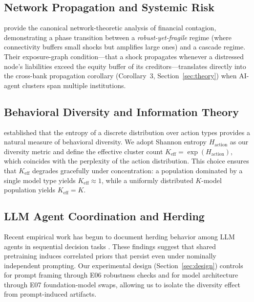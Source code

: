 
\subsection{Network Propagation and Systemic Risk}

\citet{acemoglu2015systemic} provide the canonical network-theoretic analysis of financial contagion, demonstrating a phase transition between a \emph{robust-yet-fragile} regime (where connectivity buffers small shocks but amplifies large ones) and a cascade regime. Their exposure-graph condition---that a shock propagates whenever a distressed node's liabilities exceed the equity buffer of its creditors---translates directly into the cross-bank propagation corollary (Corollary~3, Section~\ref{sec:theory}) when AI-agent clusters span multiple institutions.

\subsection{Behavioral Diversity and Information Theory}

\citet{shannon1948mathematical} established that the entropy of a discrete distribution over action types provides a natural measure of behavioral diversity. We adopt Shannon entropy $H_{\text{action}}$ as our diversity metric and define the effective cluster count $K_{\text{eff}} = \exp(H_{\text{action}})$, which coincides with the perplexity of the action distribution. This choice ensures that $K_{\text{eff}}$ degrades gracefully under concentration: a population dominated by a single model type yields $K_{\text{eff}} \approx 1$, while a uniformly distributed $K$-model population yields $K_{\text{eff}} = K$.

\subsection{LLM Agent Coordination and Herding}

Recent empirical work has begun to document herding behavior among LLM agents in sequential decision tasks \citep{TBD-llm-herding-2024}. These findings suggest that shared pretraining induces correlated priors that persist even under nominally independent prompting. Our experimental design (Section~\ref{sec:design}) controls for prompt framing through E06 robustness checks and for model architecture through E07 foundation-model swaps, allowing us to isolate the diversity effect from prompt-induced artifacts.


